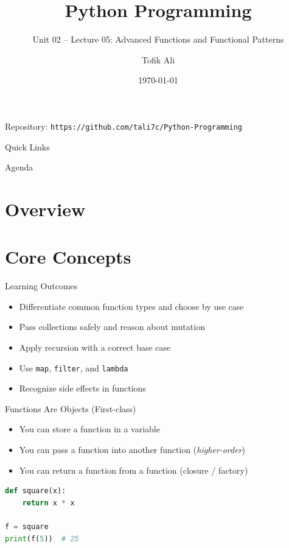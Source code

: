 \documentclass{beamer}
\title[Python Programming]{Python Programming}
\subtitle{Unit 02 -- Lecture 05: Advanced Functions and Functional Patterns}
\author{Tofik Ali}
\institute{School of Computer Science, UPES Dehradun}
\date{\today}
\begin{document}
\begin{frame}[fragile]
  \titlepage
  \vspace{0.5em}
  \begin{center}
  \footnotesize Repository: \texttt{https://github.com/tali7c/Python-Programming}
  \end{center}
\end{frame}

\begin{frame}[fragile]{Quick Links}
  \centering
  \hyperlink{sec:core}{}\hspace{1em}
  \hyperlink{sec:demo}{}\hspace{1em}
  \hyperlink{sec:interactive}{}\hspace{1em}
  \hyperlink{sec:summary}{}
\end{frame}

\begin{frame}[fragile]{Agenda}
  \tableofcontents
\end{frame}

\section{Overview}

\section{Core Concepts}
\label{sec:core}

\begin{frame}[fragile]{Learning Outcomes}
  \begin{itemize}[<+->]
    \item Differentiate common function types and choose by use case
    \item Pass collections safely and reason about mutation
    \item Apply recursion with a correct base case
    \item Use \texttt{map}, \texttt{filter}, and \texttt{lambda}
    \item Recognize side effects in functions
  \end{itemize}
\end{frame}

\begin{frame}[fragile]{Functions Are Objects (First-class)}
  \begin{itemize}[<+->]
    \item You can store a function in a variable
    \item You can pass a function into another function (\textit{higher-order})
    \item You can return a function from a function (closure / factory)
  \end{itemize}
  \vspace{0.4em}
  \begin{lstlisting}[language=Python]
def square(x):
    return x * x

f = square
print(f(5))  # 25
  \end{lstlisting}
\end{frame}
\end{document}
